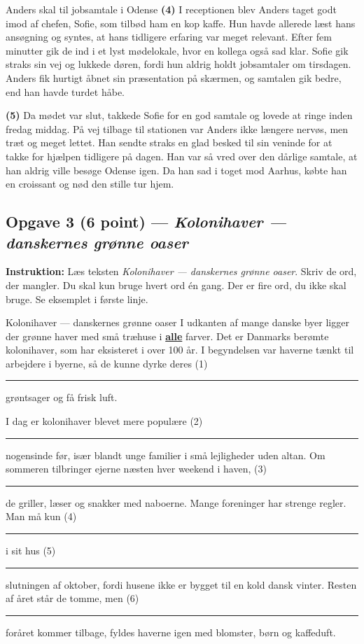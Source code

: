 \begin{emailbox}{Anders skal til jobsamtale i Odense}
\vspace{0.35em}
\textbf{(4)} I receptionen blev Anders taget godt imod af chefen, Sofie, som tilbød ham en kop kaffe. Hun havde allerede læst hans ansøgning og syntes, at hans tidligere erfaring var meget relevant. Efter fem minutter gik de ind i et lyst mødelokale, hvor en kollega også sad klar. Sofie gik straks sin vej og lukkede døren, fordi hun aldrig holdt jobsamtaler om tirsdagen. Anders fik hurtigt åbnet sin præsentation på skærmen, og samtalen gik bedre, end han havde turdet håbe.

\vspace{0.35em}
\textbf{(5)} Da mødet var slut, takkede Sofie for en god samtale og lovede at ringe inden fredag middag. På vej tilbage til stationen var Anders ikke længere nervøs, men træt og meget lettet. Han sendte straks en glad besked til sin veninde for at takke for hjælpen tidligere på dagen. Han var så vred over den dårlige samtale, at han aldrig ville besøge Odense igen. Da han sad i toget mod Aarhus, købte han en croissant og nød den stille tur hjem.
\end{emailbox}

\subsection*{Opgave 3 (6 point) --- \textit{Kolonihaver --- danskernes grønne oaser}}

\textbf{Instruktion:} Læs teksten \textit{Kolonihaver --- danskernes grønne oaser}. Skriv de ord, der mangler. Du skal kun bruge hvert ord én gang. Der er fire ord, du ikke skal bruge. Se eksemplet i første linje.

\begin{emailbox}{Kolonihaver --- danskernes grønne oaser}
I udkanten af mange danske byer ligger der grønne haver med små træhuse i \underline{\textbf{alle}} farver. Det er Danmarks berømte kolonihaver, som har eksisteret i over 100 år. I begyndelsen var haverne tænkt til arbejdere i byerne, så de kunne dyrke deres (1)\ \rule{2.1cm}{0.4pt} grøntsager og få frisk luft.

\vspace{0.4em}
I dag er kolonihaver blevet mere populære (2)\ \rule{2.1cm}{0.4pt} nogensinde før, især blandt unge familier i små lejligheder uden altan. Om sommeren tilbringer ejerne næsten hver weekend i haven, (3)\ \rule{2.1cm}{0.4pt} de griller, læser og snakker med naboerne. Mange foreninger har strenge regler. Man må kun (4)\ \rule{2.1cm}{0.4pt} i sit hus (5)\ \rule{2.1cm}{0.4pt} slutningen af oktober, fordi husene ikke er bygget til en kold dansk vinter. Resten af året står de tomme, men (6)\ \rule{2.1cm}{0.4pt} foråret kommer tilbage, fyldes haverne igen med blomster, børn og kaffeduft.
\end{emailbox}

